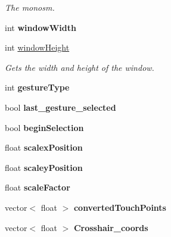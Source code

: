 \begin{DoxyCompactItemize}
\begin{DoxyCompactList}\small\item\em The monosm. \end{DoxyCompactList}\item 
\hypertarget{classtest_app_a9ed611377cd46f5148a3a3d538e96484}{int {\bfseries window\-Width}}\label{classtest_app_a9ed611377cd46f5148a3a3d538e96484}

\item 
int \hyperlink{classtest_app_a31efaa85f8a900bb659a537d56c73e03}{window\-Height}
\begin{DoxyCompactList}\small\item\em Gets the width and height of the window. \end{DoxyCompactList}\item 
\hypertarget{classtest_app_a0db6626782419f4340a3186e51788074}{int {\bfseries gesture\-Type}}\label{classtest_app_a0db6626782419f4340a3186e51788074}

\item 
\hypertarget{classtest_app_a75ac9dc8ee1df4ae07b93a9b74131924}{bool {\bfseries last\-\_\-gesture\-\_\-selected}}\label{classtest_app_a75ac9dc8ee1df4ae07b93a9b74131924}

\item 
\hypertarget{classtest_app_aa2d09c9954dc56b2aaacc99d05948885}{bool {\bfseries begin\-Selection}}\label{classtest_app_aa2d09c9954dc56b2aaacc99d05948885}

\item 
\hypertarget{classtest_app_afea17ef4df91c9cd446cd99f9b8e2ddb}{float {\bfseries scalex\-Position}}\label{classtest_app_afea17ef4df91c9cd446cd99f9b8e2ddb}

\item 
\hypertarget{classtest_app_a9e86476934494e86dd955d5888333795}{float {\bfseries scaley\-Position}}\label{classtest_app_a9e86476934494e86dd955d5888333795}

\item 
\hypertarget{classtest_app_a862943de1cd06690befd3740f6711762}{float {\bfseries scale\-Factor}}\label{classtest_app_a862943de1cd06690befd3740f6711762}

\item 
\hypertarget{classtest_app_a4764bd1bead24898cc3858707ee14ed9}{vector$<$ float $>$ {\bfseries converted\-Touch\-Points}}\label{classtest_app_a4764bd1bead24898cc3858707ee14ed9}

\item 
\hypertarget{classtest_app_a0d9a8da39f01ebe05efbaef7dc2744ea}{vector$<$ float $>$ {\bfseries Crosshair\-\_\-coords}}\label{classtest_app_a0d9a8da39f01ebe05efbaef7dc2744ea}


\end{DoxyCompactItemize}
